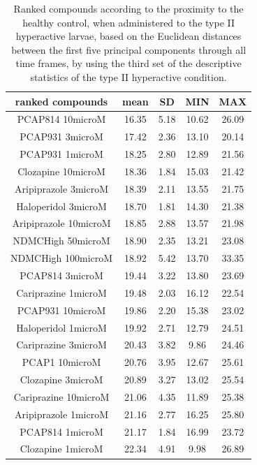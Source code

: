 \begin{table}[h!]\tiny
\centering
\caption{Ranked compounds according to the proximity to the healthy control, when administered to the type II hyperactive larvae, based on the Euclidean distances between the first five principal components through all time frames, by using the third set of the descriptive statistics of the type II hyperactive condition.}
\begin{tabular}{|c|c|c|c|c|}
\hline
ranked compounds             & mean & SD   & MIN  & MAX   \\ \hline
PCAP814 10microM      & 16.35 & 5.18 & 10.62 & 26.09 \\ \hline
PCAP931 3microM       & 17.42 & 2.36 & 13.10  & 20.14 \\ \hline
PCAP931 1microM       & 18.25 & 2.80  & 12.89 & 21.56 \\ \hline
Clozapine 10microM    & 18.36 & 1.84 & 15.03 & 21.42 \\ \hline
Aripiprazole 3microM  & 18.39 & 2.11 & 13.55 & 21.75 \\ \hline
Haloperidol 3microM   & 18.70  & 1.81 & 14.30  & 21.38 \\ \hline
Aripiprazole 10microM & 18.85 & 2.88 & 13.57 & 21.98 \\ \hline
NDMCHigh 50microM     & 18.90  & 2.35 & 13.21 & 23.08 \\ \hline
NDMCHigh 100microM    & 18.92 & 5.42 & 13.70  & 33.35 \\ \hline
PCAP814 3microM       & 19.44 & 3.22 & 13.80  & 23.69 \\ \hline
Cariprazine 1microM   & 19.48 & 2.03 & 16.12 & 22.54 \\ \hline
PCAP931 10microM      & 19.86 & 2.20  & 15.38 & 23.02 \\ \hline
Haloperidol 1microM   & 19.92 & 2.71 & 12.79 & 24.51 \\ \hline
Cariprazine 3microM   & 20.43 & 3.82 & 9.86  & 24.46 \\ \hline
PCAP1 10microM        & 20.76 & 3.95 & 12.67 & 25.61 \\ \hline
Clozapine 3microM     & 20.89 & 3.27 & 13.02 & 25.54 \\ \hline
Cariprazine 10microM  & 21.06 & 4.35 & 11.89 & 25.38 \\ \hline
Aripiprazole 1microM  & 21.16 & 2.77 & 16.25 & 25.80  \\ \hline
PCAP814 1microM       & 21.17 & 1.84 & 16.99 & 23.72 \\ \hline
Clozapine 1microM     & 22.34 & 4.91 & 9.98  & 26.89 \\ \hline

\end{tabular}
\end{table}
